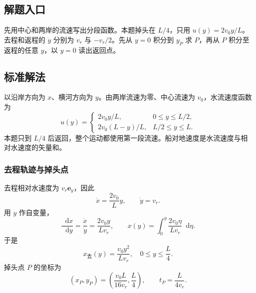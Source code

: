 \documentclass[UTF8,fontset=fandol,a4paper,11pt]{ctexart}
\newcommand{\dd}{\mathop{}\!\mathrm{d}}
\newcommand{\vect}[1]{\bm{#1}}
\begin{document}


\subsection*{解题入口}

先用中心和两岸的流速写出分段函数。本题掉头在 $L/4$，只用 $u(y)=2v_0y/L$。去程和返程的 $\dot y$ 分别为 $v_r$ 与 $-v_r/2$。先从 $y=0$ 积分到 $y_P$ 求 $P$，再从 $P$ 积分至返程的任意 $y$，以 $y=0$ 读出返回点。



\subsection*{标准解法}

以沿岸方向为 $x$、横河方向为 $y$。由两岸流速为零、中心流速为 $v_0$，水流速度函数为
\[
u(y)=\begin{cases}
2v_0y/L,&0\leq y\leq L/2,\\
2v_0(L-y)/L,&L/2\leq y\leq L.
\end{cases}
\]
本题只到 $L/4$ 后返回，整个运动都使用第一段流速。船对地速度是水流速度与相对水速度的矢量和。
\subsubsection*{去程轨迹与掉头点}
去程相对水速度为 $v_r\vect e_y$，因此
\[
\dot x=\frac{2v_0}{L}y,\qquad\dot y=v_r.
\]
用 $y$ 作自变量，
\[
\frac{\dd x}{\dd y}=\frac{\dot x}{\dot y}
=\frac{2v_0y}{Lv_r},\qquad
x(y)=\int_0^y\frac{2v_0\eta}{Lv_r}\dd\eta.
\]
于是
\[
\boxed{x_{\text{去}}(y)=\frac{v_0y^2}{Lv_r}},
\quad0\leq y\leq\frac L4.
\]
掉头点 $P$ 的坐标为
\[
(x_P,y_P)=\left(\frac{v_0L}{16v_r},\frac L4\right),
\qquad t_P=\frac{L}{4v_r}.
\]
\end{document}

